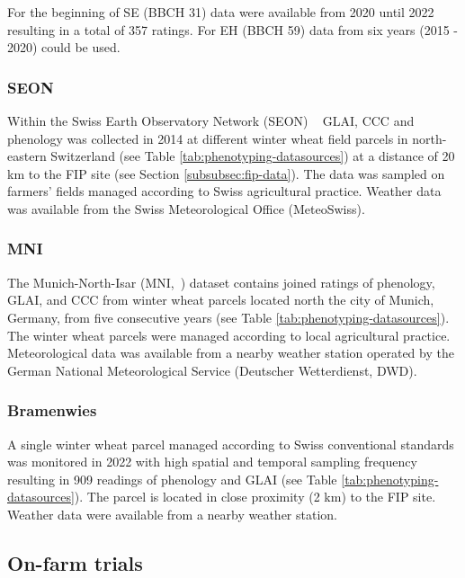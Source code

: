 For the beginning of SE (BBCH 31) data were available from 2020 until 2022 resulting in a total of 357 ratings. For EH (BBCH 59) data from six years (2015 - 2020) could be used.

\subsubsection{SEON}
\label{subsubsec:seon-data}
Within the Swiss Earth Observatory Network (SEON) ~\citep{liebisch_characterization_2014} GLAI, CCC and phenology was collected in 2014 at different winter wheat field parcels in north-eastern Switzerland (see Table \ref{tab:phenotyping-datasources}) at a distance of 20 km to the FIP site (see Section \ref{subsubsec:fip-data}). The data was sampled on farmers' fields managed according to Swiss agricultural practice. Weather data was available from the Swiss Meteorological Office (MeteoSwiss).

\subsubsection{MNI}
\label{subsubsec:mni-data}
The Munich-North-Isar (MNI,~\citep{danner_fitted_2019,wocher_physically-based_2018}) dataset contains joined ratings of phenology, GLAI, and CCC from winter wheat parcels located north the city of Munich, Germany, from five consecutive years (see Table \ref{tab:phenotyping-datasources}). The winter wheat parcels were managed according to local agricultural practice. Meteorological data was available from a nearby weather station operated by the German National Meteorological Service (Deutscher Wetterdienst, DWD).

\subsubsection{Bramenwies}
\label{subsubsec:bramenwies-data}
A single winter wheat parcel managed according to Swiss conventional standards was monitored in 2022 with high spatial and temporal sampling frequency resulting in 909 readings of phenology and GLAI (see Table \ref{tab:phenotyping-datasources}). The parcel is located in close proximity (2 km) to the FIP site. Weather data were available from a nearby weather station.

\subsection{On-farm trials}
\label{subsec:on-farm-trials}

